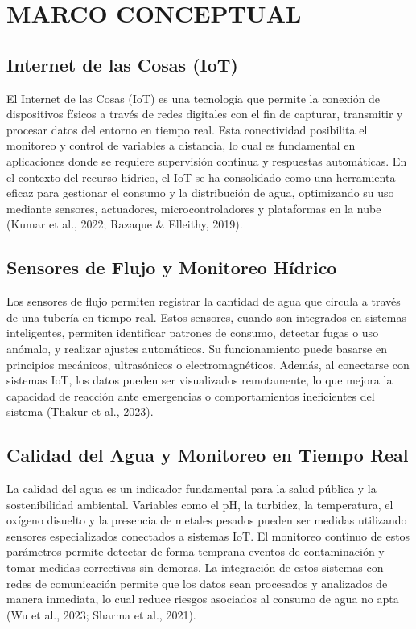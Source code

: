 \documentclass[conference]{IEEEtran}
\begin{document}
\section{MARCO CONCEPTUAL}
\subsection*{\textbf{Internet de las Cosas (IoT)}}
El Internet de las Cosas (IoT) es una tecnología que permite la conexión de dispositivos físicos a través de redes digitales con el fin de capturar, transmitir y procesar datos del entorno en tiempo real. Esta conectividad posibilita el monitoreo y control de variables a distancia, lo cual es fundamental en aplicaciones donde se requiere supervisión continua y respuestas automáticas. En el contexto del recurso hídrico, el IoT se ha consolidado como una herramienta eficaz para gestionar el consumo y la distribución de agua, optimizando su uso mediante sensores, actuadores, microcontroladores y plataformas en la nube (Kumar et al., 2022; Razaque \& Elleithy, 2019).
\subsection*{\textbf{Sensores de Flujo y Monitoreo Hídrico}}
Los sensores de flujo permiten registrar la cantidad de agua que circula a través de una tubería en tiempo real. Estos sensores, cuando son integrados en sistemas inteligentes, permiten identificar patrones de consumo, detectar fugas o uso anómalo, y realizar ajustes automáticos. Su funcionamiento puede basarse en principios mecánicos, ultrasónicos o electromagnéticos. Además, al conectarse con sistemas IoT, los datos pueden ser visualizados remotamente, lo que mejora la capacidad de reacción ante emergencias o comportamientos ineficientes del sistema (Thakur et al., 2023).
\subsection*{\textbf{Calidad del Agua y Monitoreo en Tiempo Real}}
La calidad del agua es un indicador fundamental para la salud pública y la sostenibilidad ambiental. Variables como el pH, la turbidez, la temperatura, el oxígeno disuelto y la presencia de metales pesados pueden ser medidas utilizando sensores especializados conectados a sistemas IoT. El monitoreo continuo de estos parámetros permite detectar de forma temprana eventos de contaminación y tomar medidas correctivas sin demoras. La integración de estos sistemas con redes de comunicación permite que los datos sean procesados y analizados de manera inmediata, lo cual reduce riesgos asociados al consumo de agua no apta (Wu et al., 2023; Sharma et al., 2021).
\end{document}

